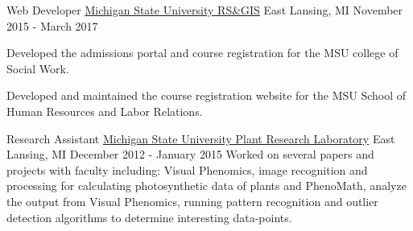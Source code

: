 \begin{cventries}
  \cventry
    {Web Developer}
    {\href{http://www.rsgis.msu.edu}{Michigan State University RS\&GIS}}
    {East Lansing, MI}
    {November 2015 - March 2017}
    {
      \begin{cvitems}
        \item {Developed the admissions portal and course registration for the MSU college of Social Work.}
        \item {Developed and maintained the course registration website for the MSU School of Human Resources and Labor Relations.}
      \end{cvitems}
    }

  \cventry
    {Research Assistant}
    {\href{https://prl.natsci.msu.edu/research-tech/center-for-advanced-algal-and-plant-phenotyping}{Michigan State University Plant Research Laboratory}}
    {East Lansing, MI}
    {December 2012 - January 2015}
    {
      {Worked on several papers and projects with faculty including: Visual Phenomics, image recognition
      and processing for calculating photosynthetic data of plants and PhenoMath, analyze the output from Visual Phenomics,
      running pattern recognition and outlier detection algorithms to determine interesting data-points. }
    }
\end{cventries}

